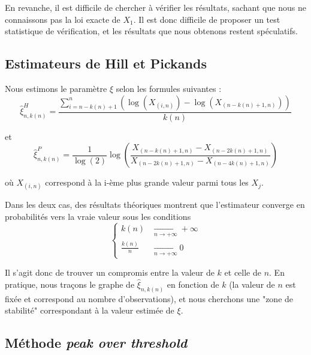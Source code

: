 \documentclass[../report.tex]{subfiles}
\begin{document}
\par En revanche, il est difficile de chercher à vérifier les résultats, sachant que nous ne connaissons pas la loi exacte de $X_1$. Il est donc difficile de proposer un test statistique de vérification, et les résultats que nous obtenons restent spéculatifs.


\subsection{Estimateurs de Hill et Pickands}
\par Nous estimons le paramètre $\xi$ selon les formules suivantes : 
\begin{equation}
  \tag{Estimateur de Hill}
  \hat{\xi}_{n, k \left( n \right)}^{H} = \frac{\sum\limits_{i = n - k \left( n \right) + 1 }^{n} \left( \log \left( X_{\left( i, n \right)} \right) - \log \left( X_{\left( n - k \left( n \right) + 1, n\right)} \right) \right)}{k \left( n \right)}
\end{equation}

et
\begin{equation}
  \tag{Estimateur de Pickands}
  \hat{\xi}_{n, k \left( n \right)}^{P} = \frac{1}{\log \left( 2 \right)} \log \left( \frac{ X_{\left( n - k \left( n \right) + 1, n\right)} - X_{\left( n - 2 k \left( n \right) + 1, n\right)}}{X_{\left( n - 2 k \left( n \right) + 1, n\right)} - X_{\left( n - 4 k \left( n \right) + 1, n\right)}} \right)
\end{equation}

où $X_{\left(i, n \right)}$ correspond à la i-ème plus grande valeur parmi tous les $X_j$.

\par Dans les deux cas, des résultats théoriques montrent que l'estimateur converge en probabilités vers la vraie valeur sous les conditions 
\begin{displaymath}
	\begin{cases}
	k \left( n \right) &\xrightarrow[n \to + \infty]{} + \infty \\
	\frac{k \left( n \right)}{n} &\xrightarrow[n \to + \infty]{} 0
	\end{cases}
\end{displaymath}

\par Il s'agit donc de trouver un compromis entre la valeur de $k$ et celle de $n$. En pratique, nous traçons le graphe de $ \hat{\xi}_{n, k \left( n \right)}$ en fonction de $k$ (la valeur de $n$ est fixée et correspond au nombre d'observations), et nous cherchons une "zone de stabilité" correspondant à la valeur estimée de $\xi$.

\subsection{Méthode \emph{peak over threshold}}
\end{document}

